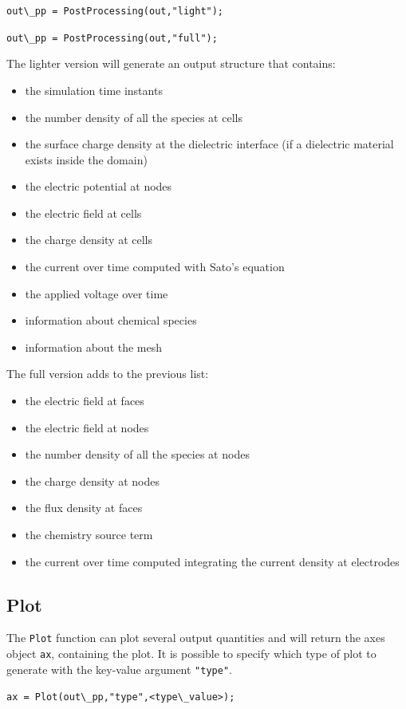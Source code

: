 \documentclass[12pt,a4paper]{article}
\newcommand{\matlabs}[1]{{\lstinline[style=MatlabStyle]!#1!}}
\begin{document}
\matlabs{out\_pp = PostProcessing(out,"light");}

\matlabs{out\_pp = PostProcessing(out,"full");}

\noindent The lighter version will generate an output structure that contains:
\begin{itemize}
	\item the simulation time instants
	\item the number density of all the species at cells
	\item the surface charge density at the dielectric interface (if a dielectric material exists inside the domain)
	\item the electric potential at nodes
	\item the electric field at cells
	\item the charge density at cells
	\item the current over time computed with Sato's equation
	\item the applied voltage over time
	\item information about chemical species 
	\item information about the mesh
\end{itemize}

\noindent The full version adds to the previous list:
\begin{itemize}
	\item the electric field at faces
	\item the electric field at nodes
	\item the number density of all the species at nodes
	\item the charge density at nodes
	\item the flux density at faces
	\item the chemistry source term
	\item the current over time computed integrating the current density at electrodes
\end{itemize}


\subsection{Plot}
The \matlabs{Plot} function can plot several output quantities and will return the axes object \matlabs{ax}, containing the plot. It is possible to specify which type of plot to generate with the key-value argument \matlabs{"type"}.

\matlabs{ax = Plot(out\_pp,"type",<type\_value>);}
\end{document}
